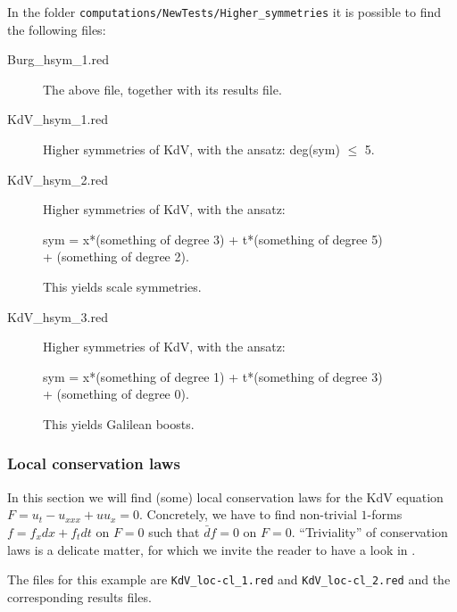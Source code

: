 In the folder \texttt{computations/NewTests/Higher\_symmetries} it is possible
to find the following files:
\begin{description}
\item[Burg\_hsym\_1.red] The above file, together with its results file.
  \item[KdV\_hsym\_1.red] Higher symmetries of KdV, with the ansatz:
    deg(sym) $\leq$ 5.
\item[KdV\_hsym\_2.red] Higher symmetries of KdV, with the ansatz:
  \begin{center}
    sym = x*(something of degree 3) + t*(something of degree  5)\\
  + (something of degree 2).
  \end{center}
    This yields scale symmetries.
\item[KdV\_hsym\_3.red] Higher symmetries of KdV, with the ansatz:
  \begin{center}
    sym = x*(something of degree 1) + t*(something of degree 3)\\
    + (something of degree 0).
  \end{center}
This yields Galilean boosts.
\end{description}

\subsubsection{Local conservation laws}
\label{sec:local-cons-laws}

In this section we will find (some) local conservation laws for the KdV
equation $F=u_t-u_{xxx}+uu_x=0$. Concretely, we have to find non-trivial $1$-forms
$f=f_xdx+f_tdt$ on $F=0$ such that $\bar d f=0$ on $F=0$. ``Triviality'' of
conservation laws is a delicate matter, for which we invite the reader to have
a look in \cite{Krasilshchik:99}.

The files for this example are \texttt{KdV\_loc-cl\_1.red} and
  \texttt{KdV\_loc-cl\_2.red} and the corresponding results files.

